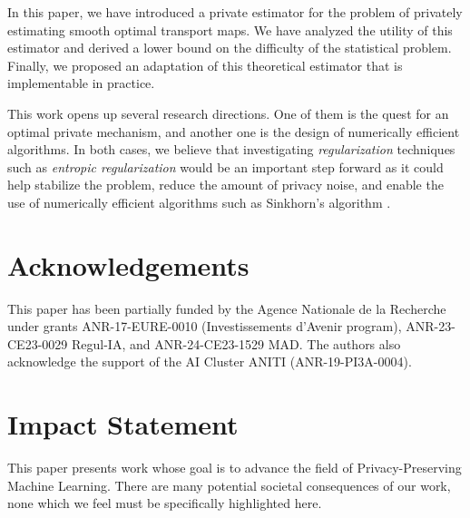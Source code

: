 \documentclass{article}
\theoremstyle{plain}
\theoremstyle{definition}
\theoremstyle{remark}
\begin{document}
In this paper, we have introduced a private estimator for the problem of privately estimating smooth optimal transport maps. 
We have analyzed the utility of this estimator and derived a lower bound on the difficulty of the statistical problem. 
Finally, we proposed an adaptation of this theoretical estimator that is implementable in practice.

This work opens up several research directions. 
One of them is the quest for an optimal private mechanism, and another one is the design of numerically efficient algorithms.
In both cases, we believe that investigating \emph{regularization} techniques such as \emph{entropic regularization} would be an important step forward as it could help stabilize the problem, reduce the amount of privacy noise, and enable the use of numerically efficient algorithms such as Sinkhorn's algorithm \cite{cuturi2013sinkhorn}.




\section*{Acknowledgements}

This paper has been partially funded by the Agence Nationale de la Recherche under grants ANR-17-EURE-0010 (Investissements d'Avenir program), ANR-23-CE23-0029 Regul-IA, and ANR-24-CE23-1529 MAD. The authors also acknowledge the support of the AI Cluster ANITI (ANR-19-PI3A-0004).

\section*{Impact Statement}

This paper presents work whose goal is to advance the field
 of Privacy-Preserving Machine Learning. There are many potential societal
 consequences of our work, none which we feel must be
 specifically highlighted here.





\newpage
\appendix
\onecolumn
\end{document}
